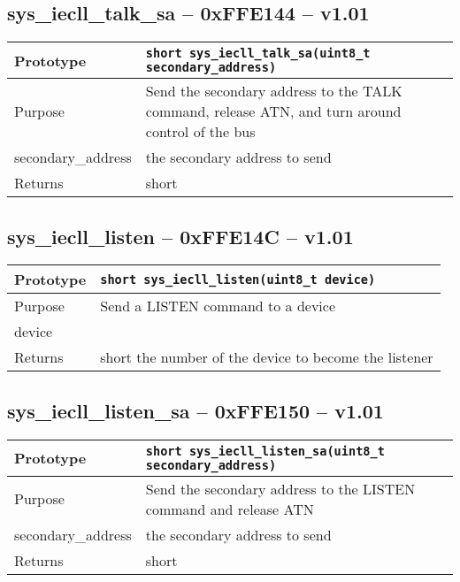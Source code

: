 \subsection*{sys\_iecll\_talk\_sa -- 0xFFE144 -- v1.01}
\begin{table}[!h]\begin{tabular}{|l||l|} \hline
Prototype & \lstinline!short sys_iecll_talk_sa(uint8_t secondary_address)! \\ \hline
Purpose & Send the secondary address to the TALK command, release ATN, and turn around control of the bus \\ \hline
secondary\_address & the secondary address to send \\ \hline
Returns & short \\ \hline
\end{tabular}\end{table}

\subsection*{sys\_iecll\_listen -- 0xFFE14C -- v1.01}
\begin{table}[!h]\begin{tabular}{|l||l|} \hline
Prototype & \lstinline!short sys_iecll_listen(uint8_t device)! \\ \hline
Purpose & Send a LISTEN command to a device \\ \hline
device &  \\ \hline
Returns & short the number of the device to become the listener \\ \hline
\end{tabular}\end{table}

\subsection*{sys\_iecll\_listen\_sa -- 0xFFE150 -- v1.01}
\begin{table}[!h]\begin{tabular}{|l||l|} \hline
Prototype & \lstinline!short sys_iecll_listen_sa(uint8_t secondary_address)! \\ \hline
Purpose & Send the secondary address to the LISTEN command and release ATN \\ \hline
secondary\_address & the secondary address to send \\ \hline
Returns & short \\ \hline
\end{tabular}\end{table}

